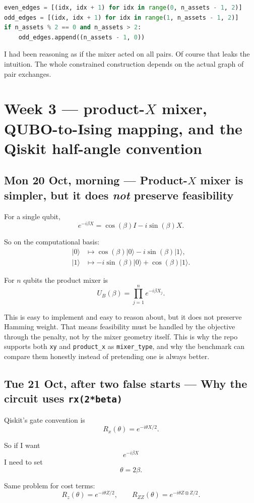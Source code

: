 \documentclass[11pt]{article}
\newcommand{\entry}[2]{\subsection*{#1 --- #2}}
\newcommand{\repo}[1]{\texttt{#1}}
\begin{document}
\begin{lstlisting}[language=Python]
even_edges = [(idx, idx + 1) for idx in range(0, n_assets - 1, 2)]
odd_edges = [(idx, idx + 1) for idx in range(1, n_assets - 1, 2)]
if n_assets % 2 == 0 and n_assets > 2:
    odd_edges.append((n_assets - 1, 0))
\end{lstlisting}

I had been reasoning as if the mixer acted on all pairs. Of course that leaks the intuition.
The whole constrained construction depends on the actual graph of pair exchanges.

\section*{Week 3 --- product-\(X\) mixer, QUBO-to-Ising mapping, and the Qiskit half-angle convention}

\entry{Mon 20 Oct, morning}{Product-\(X\) mixer is simpler, but it does \emph{not} preserve feasibility}

For a single qubit,
\[
e^{-i\beta X} = \cos(\beta)I - i\sin(\beta)X.
\]

So on the computational basis:
\begin{align*}
\lvert 0 \rangle &\mapsto \cos(\beta)\lvert 0 \rangle - i\sin(\beta)\lvert 1 \rangle, \\
\lvert 1 \rangle &\mapsto -i\sin(\beta)\lvert 0 \rangle + \cos(\beta)\lvert 1 \rangle.
\end{align*}

For \(n\) qubits the product mixer is
\[
U_B(\beta)
=
\prod_{j=1}^{n} e^{-i\beta X_j}.
\]

This is easy to implement and easy to reason about, but it does not preserve Hamming weight.
That means feasibility must be handled by the objective through the penalty, not by the mixer
geometry itself. This is why the repo supports both \repo{xy} and \repo{product\_x} as
\repo{mixer\_type}, and why the benchmark can compare them honestly instead of pretending one is
always better.

\entry{Tue 21 Oct, after two false starts}{Why the circuit uses \texorpdfstring{\repo{rx(2*beta)}}{rx(2 beta)}}

Qiskit's gate convention is
\[
R_x(\theta) = e^{-i \theta X / 2}.
\]

So if I want
\[
e^{-i \beta X}
\]
I need to set
\[
\theta = 2\beta.
\]

Same problem for cost terms:
\[
R_z(\theta) = e^{-i\theta Z / 2},
\qquad
R_{ZZ}(\theta) = e^{-i\theta Z\otimes Z / 2}.
\]
\end{document}
